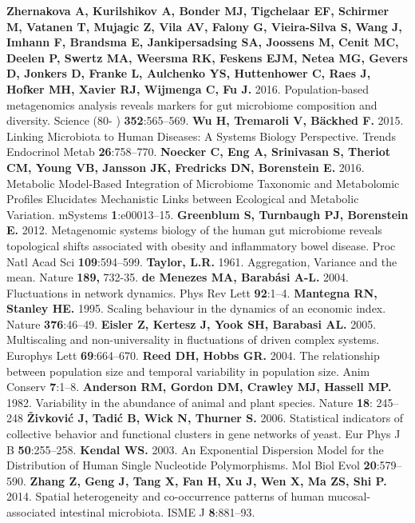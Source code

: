 \documentclass[12pt,oneside,letterpaper]{article}
\begin{document}
\begin{thebibliography}{99}
 {\bf Zhernakova A, Kurilshikov A, Bonder MJ, Tigchelaar EF, Schirmer M, Vatanen T, Mujagic Z, Vila AV, Falony G, Vieira-Silva S, Wang J, Imhann F, Brandsma E, Jankipersadsing SA, Joossens M, Cenit MC, Deelen P, Swertz MA, Weersma RK, Feskens EJM, Netea MG, Gevers D, Jonkers D, Franke L, Aulchenko YS, Huttenhower C, Raes J, Hofker MH, Xavier RJ, Wijmenga C, Fu J.} 2016. Population-based metagenomics analysis reveals markers for gut microbiome composition and diversity. Science (80- ) {\bf 352}:565–569.
 {\bf Wu H, Tremaroli V, Bäckhed F.} 2015. Linking Microbiota to Human Diseases: A Systems Biology Perspective. Trends Endocrinol Metab {\bf 26}:758–770.
 {\bf Noecker C, Eng A, Srinivasan S, Theriot CM, Young VB, Jansson JK, Fredricks DN, Borenstein E.} 2016. Metabolic Model-Based Integration of Microbiome Taxonomic and Metabolomic Profiles Elucidates Mechanistic Links between Ecological and Metabolic Variation. mSystems {\bf 1}:e00013–15.
 {\bf Greenblum S, Turnbaugh PJ, Borenstein E.} 2012. Metagenomic systems biology of the human gut microbiome reveals topological shifts associated with obesity and inflammatory bowel disease. Proc Natl Acad Sci {\bf 109}:594–599.
 {\bf Taylor, L.R.} 1961. Aggregation, Variance and the mean. Nature {\bf 189,} 732-35.
 {\bf de Menezes MA, Barabási A-L.} 2004. Fluctuations in network dynamics. Phys Rev Lett {\bf 92}:1–4.
 {\bf Mantegna RN, Stanley HE.} 1995. Scaling behaviour in the dynamics of an economic index. Nature {\bf 376}:46–49.
 {\bf Eisler Z, Kertesz J, Yook SH, Barabasi AL.} 2005. Multiscaling and non-universality in fluctuations of driven complex systems. Europhys Lett {\bf 69}:664–670.
 {\bf Reed DH, Hobbs GR.} 2004. The relationship between population size and temporal variability in population size. Anim Conserv {\bf 7}:1–8.
 {\bf Anderson RM, Gordon DM, Crawley MJ, Hassell MP.} 1982. Variability in the abundance of animal and plant species. Nature {\bf 18}: 245–248
 {\bf Živković J, Tadić B, Wick N, Thurner S.} 2006. Statistical indicators of collective behavior and functional clusters in gene networks of yeast. Eur Phys J B {\bf 50}:255–258.
 {\bf Kendal WS.} 2003. An Exponential Dispersion Model for the Distribution of Human Single Nucleotide Polymorphisms. Mol Biol Evol {\bf 20}:579–590.
 {\bf Zhang Z, Geng J, Tang X, Fan H, Xu J, Wen X, Ma ZS, Shi P.} 2014. Spatial heterogeneity and co-occurrence patterns of human mucosal-associated intestinal microbiota. ISME J {\bf 8}:881–93.

\end{thebibliography}
\end{document}
